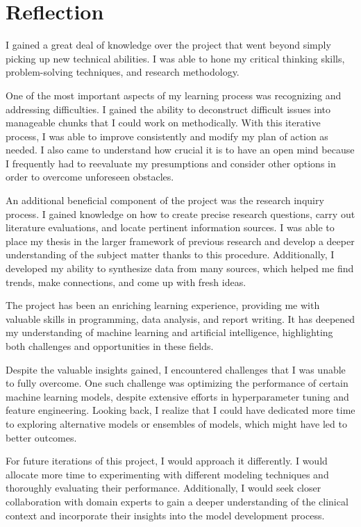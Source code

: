 \chapter{Reflection}
I gained a great deal of knowledge over the project that went beyond simply picking up new technical abilities. I was able to hone my critical thinking skills, problem-solving techniques, and research methodology.

One of the most important aspects of my learning process was recognizing and addressing difficulties. I gained the ability to deconstruct difficult issues into manageable chunks that I could work on methodically. With this iterative process, I was able to improve consistently and modify my plan of action as needed. I also came to understand how crucial it is to have an open mind because I frequently had to reevaluate my presumptions and consider other options in order to overcome unforeseen obstacles.

An additional beneficial component of the project was the research inquiry process. I gained knowledge on how to create precise research questions, carry out literature evaluations, and locate pertinent information sources. I was able to place my thesis in the larger framework of previous research and develop a deeper understanding of the subject matter thanks to this procedure. Additionally, I developed my ability to synthesize data from many sources, which helped me find trends, make connections, and come up with fresh ideas.

The project has been an enriching learning experience, providing me with valuable skills in programming, data analysis, and report writing. It has deepened my understanding of machine learning and artificial intelligence, highlighting both challenges and opportunities in these fields.

Despite the valuable insights gained, I encountered challenges that I was unable to fully overcome. One such challenge was optimizing the performance of certain machine learning models, despite extensive efforts in hyperparameter tuning and feature engineering. Looking back, I realize that I could have dedicated more time to exploring alternative models or ensembles of models, which might have led to better outcomes.

For future iterations of this project, I would approach it differently. I would allocate more time to experimenting with different modeling techniques and thoroughly evaluating their performance. Additionally, I would seek closer collaboration with domain experts to gain a deeper understanding of the clinical context and incorporate their insights into the model development process.

